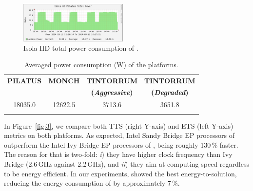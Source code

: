 \begin{figure}[htbf]
  \centering
  \includegraphics[width=0.48\textwidth]{Figs/NRJ_benchmark_Pilatus.eps}
  \caption{Isola HD total power consumption of \pilat.}
  \label{fig:2}
\end{figure}

\begin{table}[htbf]
  \centering
  \caption{Averaged power consumption (W) of the platforms.}
  \label{tab:1}
  \begin{tabular}{cccc}
    \hline\noalign{\smallskip}     \textbf{\scriptsize{PILATUS}}     &
    \textbf{\scriptsize{MONCH}}  &  \textbf{\scriptsize{TINTORRUM}}  &
    \textbf{\scriptsize{TINTORRUM}}           \\          &          &
    \textbf{\scriptsize{(\emph{Aggressive})}} & \textbf{\scriptsize{(\emph{Degraded})}}
    \\    \noalign{\smallskip}\hline\noalign{\smallskip}   18035.0   &
    12622.5 & 3713.6 & 3651.8 \\ \noalign{\smallskip}\hline
  \end{tabular}
\end{table}

In  Figure~\ref{fig:3}, we  compare both  TTS (right  Y-axis)  and ETS
(left  Y-axis)  metrics  on  both  platforms.  As  expected, Intel Sandy Bridge EP processors of \pilat
outperform the Intel Ivy  Bridge EP processors of \monch, being roughly 130\,\%  faster.  The reason
for that is two-fold: \emph{i}) they have higher clock frequency than Ivy
Bridge  (2.6\,GHz  against  2.2\,GHz),   and  \emph{ii})  they  aim  at
computing   speed  regardless   to  be   energy  efficient.    In  our
experiments,  \monch  showed  the  best  energy-to-solution,
reducing the energy consumption of \pilat by approximately 7\,\%.

